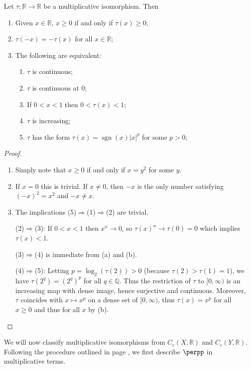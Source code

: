 \begin{proposition}\label{theoremclassificationmultiplicativeisomorphismsofr}
Let $\tau:\mathbb{R}\to\mathbb{R}$ be a multiplicative isomorphism. Then
\begin{enumerate}
\item[(a)] Given $x\in\mathbb{R}$, $x\geq 0$ if and only if $\tau(x)\geq 0$;
\item[(b)] $\tau(-x)=-\tau(x)$ for all $x\in\mathbb{R}$;
\item[(c)] The following are equivalent:
\begin{enumerate}
\item[(1)] $\tau$ is continuous;
\item[(2)] $\tau$ is continuous at $0$;
\item[(3)] If $0<x<1$ then $0<\tau(x)<1$;
\item[(4)] $\tau$ is increasing;
\item[(5)] $\tau$ has the form $\tau(x)=\operatorname{sgn}(x)|x|^p$ for some $p>0$;
\end{enumerate}
\end{enumerate}
\end{proposition}
\begin{proof}
\begin{enumerate}
\item[(a)] Simply note that $x\geq 0$ if and only if $x=y^2$ for some $y$.
\item[(b)] If $x=0$ this is trivial. If $x\neq 0$, then $-x$ is the only number satisfying $(-x)^2=x^2$ and $-x\neq x$.
\item[(c)] The implications (5)$\Rightarrow$(1)$\Rightarrow$(2) are trivial.

\noindent(2)$\Rightarrow$(3): If $0<x<1$ then $x^n\to 0$, so $\tau(x)^n\to \tau(0)=0$ which implies $\tau(x)<1$.

\noindent(3)$\Rightarrow$(4) is immediate from (a) and (b).

\noindent(4)$\Rightarrow$(5): Letting $p=\log_2(\tau(2))>0$ (because $\tau(2)>\tau(1)=1$), we have $\tau(2^q)=(2^q)^p$ for all $q\in\mathbb{Q}$. Thus the restriction of $\tau$ to $[0,\infty)$ is an increasing map with dense image, hence surjective and continuous. Moreover, $\tau$ coincides with $x\mapsto x^p$ on a dense set of $[0,\infty)$, thus $\tau(x)=x^p$ for all $x\geq 0$ and thus for all $x$ by (b).\qedhere
\end{enumerate}
\end{proof}

We will now classify multiplicative isomorphisms from $C_c(X,\mathbb{R})$ and $C_c(Y,\mathbb{R})$. Following the procedure outlined in page \pageref{generalprocedureforclassification}, we first describe $\perpp$ in multiplicative terms.

